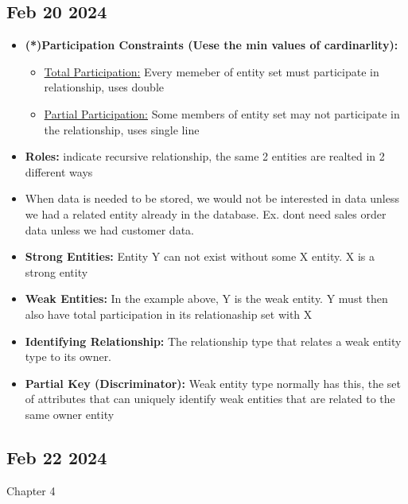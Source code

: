 \documentclass[12pt]{article}
\begin{document}
\subsection*{Feb 20 2024}

\begin{itemize}
			\item \textbf{(*)Participation Constraints (Uese the min values of cardinarlity):}
					\begin{itemize}
							\item \underline{Total Participation:} Every memeber of entity set must participate
							in relationship, uses double
							\item \underline{Partial Participation:} Some members of entity set may not participate
							in the relationship, uses single line
					\end{itemize}
			\item \textbf{Roles:} indicate recursive relationship, the same 2 entities are realted in 
						2 different ways
			\item When data is needed to be stored, we would not be interested in data unless we had a 
			related entity already in the database. Ex. dont need sales order data unless we had 
			customer data. 
			\item \textbf{Strong Entities:} Entity Y can not exist without some X entity. X is a strong entity
			\item \textbf{Weak Entities:} In the example above, Y is the weak entity. Y must then also
			have total participation in its relationaship set with X
			\item \textbf{Identifying Relationship:} The relationship type that relates a weak entity type to its 
			owner.
			\item \textbf{Partial Key (Discriminator):} Weak entity type normally has this, 
			the set of attributes that can 
			uniquely identify weak entities that are related to the same owner entity
\end{itemize}

\subsection*{Feb 22 2024}

Chapter 4
\end{document}
